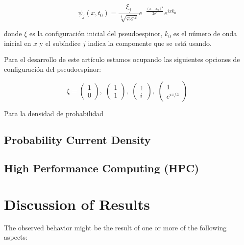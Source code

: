 \documentclass[twocolumn]{revtex4-2}
\begin{document}
    \begin{equation}
        \label{eq:GWP}
        \psi_j(x,t_0)=\frac{\xi_j}{\sqrt[4]{\pi\sigma^2}}e^{-\frac{(x-x_0)^2}{2\sigma^2}}e^{ixk_0}
    \end{equation}

    \noindent donde $\xi$ es la configuración inicial del pseudoespinor, $k_0$ es el número de onda inicial en $x$ y el subíndice $j$ indica la componente que se está usando.

    Para el desarrollo de este artículo estamos ocupando las siguientes opciones de configuración del pseudoespinor:

    \begin{equation}
        \label{eq:pseudospinorConfigurations}
        \xi=\begin{pmatrix} 1\\0
        \end{pmatrix},\,\,\begin{pmatrix} 1\\1
        \end{pmatrix},\,\,\begin{pmatrix} 1\\i
        \end{pmatrix},\,\,\begin{pmatrix} 1\\e^{i\pi/4}
        \end{pmatrix}
    \end{equation}

    Para la densidad de probabilidad

    \subsection{Probability Current Density}\label{subsec:probability-current-density}

    \subsection{High Performance Computing (HPC)}\label{subsec:high-performance-computing-(hpc)}




    \section{Discussion of Results}\label{sec:discussion-of-results}

        The observed behavior might be the result of one or more of the following aspects:
\end{document}
